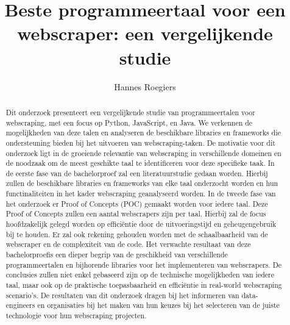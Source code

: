 \documentclass{hogent-article}
\title{Beste programmeertaal voor een webscraper: een vergelijkende studie}
\author{Hannes Roegiers}
\begin{document}
\begin{abstract}
  Dit onderzoek presenteert een vergelijkende studie van programmeertalen voor webscraping, met een focus op Python, JavaScript, en Java. 
  We verkennen de mogelijkheden van deze talen en analyseren de beschikbare libraries en frameworks die ondersteuning bieden bij het uitvoeren van webscraping-taken. 
  De motivatie voor dit onderzoek ligt in de groeiende relevantie van webscraping in verschillende domeinen en de noodzaak om de meest 
  geschikte taal te identificeren voor deze specifieke taak.
  In de eerste fase van de bachelorproef zal een literatuurstudie gedaan worden. Hierbij zullen de beschikbare libraries en frameworks van elke
  taal onderzocht worden en hun functinaliteiten in het kader webscraping geanalyseerd worden.
  In de tweede fase van het onderzoek er Proof of Concepts (POC) gemaakt worden voor iedere taal. Deze Proof of Concepts zullen
  een aantal webscrapers zijn per taal. Hierbij zal de focus hoofdzakelijk gelegd worden op efficiëntie door de uitvoeringstijd en geheugengebruik
  bij te houden. Er zal ook rekening gehouden worden met de schaalbaarheid van de webscraper en de complexiteit van de code.
  Het verwachte resultaat van deze bachelorproefis een dieper begrip van de geschikheid van verschillende programmeertalen en bijhorende
  libraries voor het implementeren van webscrapers. De conclusies zullen niet enkel gebaseerd zijn op de technische mogelijkheden
  van iedere taal, maar ook op de praktische toepasbaarheid en efficiëntie in real-world webscraping scenario's. De resultaten van 
  dit onderzoek dragen bij het informeren van data-engineers en organisaties bij het maken van hun keuzes bij het selecteren van 
  de juiste technologie voor hun webscraping projecten.
\end{abstract}

\tableofcontents



\printbibliography[heading=bibintoc]
\end{document}
